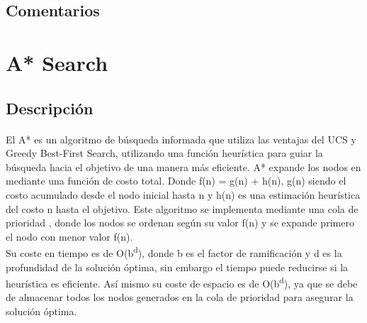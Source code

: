 \documentclass{report}
\begin{document}
        \subsection*{Comentarios}
          \paragraph*{}{

          }
      \clearpage\section{A* Search}
        \subsection*{Descripción}
          \paragraph*{}{
            El A* es un algoritmo de búsqueda informada que utiliza las ventajas del UCS y Greedy Best-First Search, utilizando una función heurística para guiar la búsqueda hacia el objetivo de una manera más eficiente. A* expande los nodos en mediante una función de costo total. Donde f(n) = g(n) + h(n), g(n) siendo el costo acumulado desde el nodo inicial hasta n y h(n) es una estimación heurística del costo n hasta el objetivo. Este algoritmo se implementa mediante una cola de prioridad , donde los nodos se ordenan según su valor f(n) y se expande primero el nodo con menor valor f(n).\\
            Su coste en tiempo es de O(b\textsuperscript{d}), donde b es el factor de ramificación y d es la profundidad de la solución óptima, sin embargo el tiempo puede reducirse si la heurística es eficiente. Así mismo su coste de espacio es de  O(b\textsuperscript{d}), ya que se debe de almacenar todos los nodos generados en la cola de prioridad para asegurar la solución óptima.
          }
\end{document}
